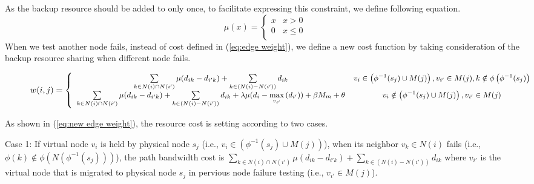 As the backup resource should be added to only once, to facilitate expressing  this constraint, we define following equation.
\begin{equation}
\mu (x) = \left\{ {\begin{array}{*{20}{c}}
   x & {x > 0}  \\
   0 & {x \le 0}  \\
\end{array}} \right.
\end{equation}
When we test another node fails, instead of cost defined in (\ref{eq:edge weight}), we define a new cost function by taking consideration of the backup resource sharing when different node fails.
\begin{figure}
  \centering
    \begin{equation}
  \footnotesize
w(i,j) = \left\{ {\begin{array}{*{20}{c}}
   {\sum\limits_{k \in N(i) \cap N(i')} {\mu({d_{ik}} - {d_{i'k}})}  + \sum\limits_{k \in \left( {N(i) - N(i')} \right)} {{d_{ik}}} } & {{v_i} \in \left( {{\phi ^{ - 1}}({s_j}) \cup M(j)} \right),{v_{i'}} \in M(j),k \notin \phi \left( {{\phi ^{ - 1}}({s_j})} \right)}  \\
   {\sum\limits_{k \in N(i) \cap N(i')} {\mu({d_{ik}} - {d_{i'k}})}  + \sum\limits_{k \in \left( {N(i) - N(i')} \right)} {{d_{ik}}}  + \lambda \mu({d_i} - \mathop {\max }\limits_{{v_{i'}}} \left( {{d_{i'}}} \right)) + \beta {M_m} + \theta } & {{v_i} \notin \left( {{\phi ^{ - 1}}({s_j}) \cup M(j)} \right),{v_{i'}} \in M(j)}  \\
\end{array}} \right.
    \label{eq:new edge weight}
    \end{equation}
\end{figure}

As shown in (\ref{eq:new edge weight}), the resource cost is setting according to two cases.

Case 1: If virtual node $v_i$ is held by  physical node $s_j$ (i.e., ${{v_i} \in \left( {{\phi ^{ - 1}}({s_j}) \cup M(j)} \right)}$), when its neighbor $v_k \in N(i)$ fails (i.e., ${\phi \left( k \right) \notin \phi \left(N\left( {{\phi ^{ - 1}}({s_j})} \right)\right)}$), the path bandwidth cost is ${\sum\limits_{k \in N(i) \cap N(i')} {\mu({d_{ik}} - {d_{i'k}})}  + \sum\limits_{k \in \left( {N(i) - N(i')} \right)} {{d_{ik}}} }$ where ${v_{i'}}$ is the  virtual node that is migrated to physical node $s_j$ in pervious node failure testing (i.e., ${v_{i'}} \in M(j)$).

